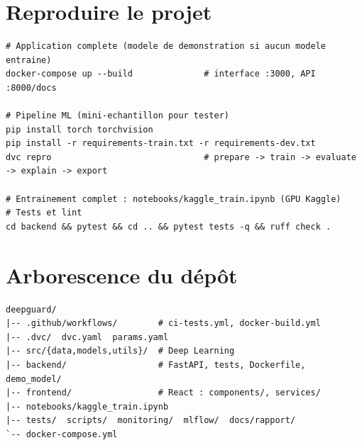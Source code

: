 \documentclass[11pt,a4paper]{article}
\begin{document}
\appendix
\section{Reproduire le projet}

\begin{lstlisting}
# Application complete (modele de demonstration si aucun modele entraine)
docker-compose up --build              # interface :3000, API :8000/docs

# Pipeline ML (mini-echantillon pour tester)
pip install torch torchvision
pip install -r requirements-train.txt -r requirements-dev.txt
dvc repro                              # prepare -> train -> evaluate -> explain -> export

# Entrainement complet : notebooks/kaggle_train.ipynb (GPU Kaggle)
# Tests et lint
cd backend && pytest && cd .. && pytest tests -q && ruff check .
\end{lstlisting}

\section{Arborescence du dépôt}

\begin{lstlisting}
deepguard/
|-- .github/workflows/        # ci-tests.yml, docker-build.yml
|-- .dvc/  dvc.yaml  params.yaml
|-- src/{data,models,utils}/  # Deep Learning
|-- backend/                  # FastAPI, tests, Dockerfile, demo_model/
|-- frontend/                 # React : components/, services/
|-- notebooks/kaggle_train.ipynb
|-- tests/  scripts/  monitoring/  mlflow/  docs/rapport/
`-- docker-compose.yml
\end{lstlisting}
\end{document}
